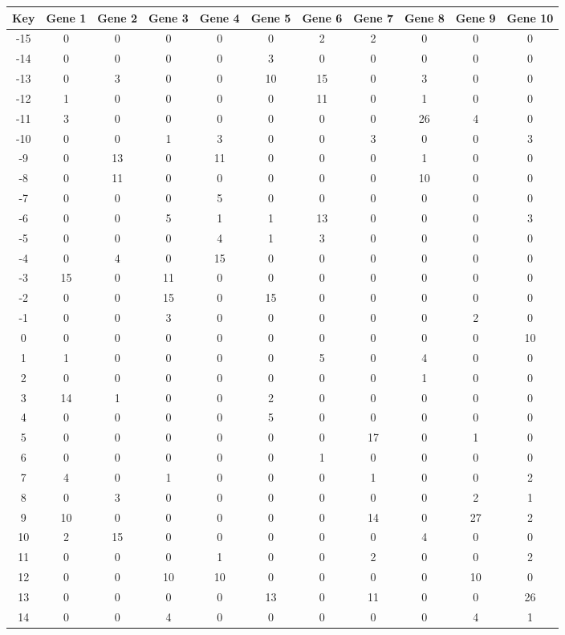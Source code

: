 \begin{tabular}{|c|c|c|c|c|c|c|c|c|c|c|}
\hline
Key & Gene 1 & Gene 2 & Gene 3 & Gene 4 & Gene 5 & Gene 6 & Gene 7 & Gene 8 & Gene 9 & Gene 10 \\
\hline
-15 & 0 & 0 & 0 & 0 & 0 & 2 & 2 & 0 & 0 & 0 \\
-14 & 0 & 0 & 0 & 0 & 3 & 0 & 0 & 0 & 0 & 0 \\
-13 & 0 & 3 & 0 & 0 & 10 & 15 & 0 & 3 & 0 & 0 \\
-12 & 1 & 0 & 0 & 0 & 0 & 11 & 0 & 1 & 0 & 0 \\
-11 & 3 & 0 & 0 & 0 & 0 & 0 & 0 & 26 & 4 & 0 \\
-10 & 0 & 0 & 1 & 3 & 0 & 0 & 3 & 0 & 0 & 3 \\
-9 & 0 & 13 & 0 & 11 & 0 & 0 & 0 & 1 & 0 & 0 \\
-8 & 0 & 11 & 0 & 0 & 0 & 0 & 0 & 10 & 0 & 0 \\
-7 & 0 & 0 & 0 & 5 & 0 & 0 & 0 & 0 & 0 & 0 \\
-6 & 0 & 0 & 5 & 1 & 1 & 13 & 0 & 0 & 0 & 3 \\
-5 & 0 & 0 & 0 & 4 & 1 & 3 & 0 & 0 & 0 & 0 \\
-4 & 0 & 4 & 0 & 15 & 0 & 0 & 0 & 0 & 0 & 0 \\
-3 & 15 & 0 & 11 & 0 & 0 & 0 & 0 & 0 & 0 & 0 \\
-2 & 0 & 0 & 15 & 0 & 15 & 0 & 0 & 0 & 0 & 0 \\
-1 & 0 & 0 & 3 & 0 & 0 & 0 & 0 & 0 & 2 & 0 \\
0 & 0 & 0 & 0 & 0 & 0 & 0 & 0 & 0 & 0 & 10 \\
1 & 1 & 0 & 0 & 0 & 0 & 5 & 0 & 4 & 0 & 0 \\
2 & 0 & 0 & 0 & 0 & 0 & 0 & 0 & 1 & 0 & 0 \\
3 & 14 & 1 & 0 & 0 & 2 & 0 & 0 & 0 & 0 & 0 \\
4 & 0 & 0 & 0 & 0 & 5 & 0 & 0 & 0 & 0 & 0 \\
5 & 0 & 0 & 0 & 0 & 0 & 0 & 17 & 0 & 1 & 0 \\
6 & 0 & 0 & 0 & 0 & 0 & 1 & 0 & 0 & 0 & 0 \\
7 & 4 & 0 & 1 & 0 & 0 & 0 & 1 & 0 & 0 & 2 \\
8 & 0 & 3 & 0 & 0 & 0 & 0 & 0 & 0 & 2 & 1 \\
9 & 10 & 0 & 0 & 0 & 0 & 0 & 14 & 0 & 27 & 2 \\
10 & 2 & 15 & 0 & 0 & 0 & 0 & 0 & 4 & 0 & 0 \\
11 & 0 & 0 & 0 & 1 & 0 & 0 & 2 & 0 & 0 & 2 \\
12 & 0 & 0 & 10 & 10 & 0 & 0 & 0 & 0 & 10 & 0 \\
13 & 0 & 0 & 0 & 0 & 13 & 0 & 11 & 0 & 0 & 26 \\
14 & 0 & 0 & 4 & 0 & 0 & 0 & 0 & 0 & 4 & 1 \\
\hline
\end{tabular}